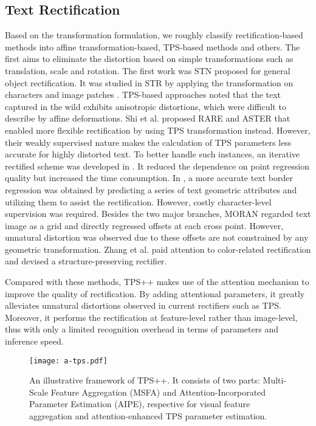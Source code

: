 \documentclass{article}
\begin{document}
\subsection{Text Rectification}
Based on the transformation formulation, we roughly classify rectification-based methods into affine transformation-based, TPS-based methods and others.
The first aims to eliminate the distortion based on simple transformations such as translation, scale and rotation. The first work was STN \cite{jaderberg2015stn} proposed for general object rectification. It was studied in STR by applying the transformation on characters \cite{liu2016starnet} and image patches \cite{lin2021stan}.
TPS-based approaches noted that the text captured in the wild exhibits anisotropic distortions, which were difficult to describe by affine deformations. Shi et al. proposed RARE \cite{shi2016robust_auto_rect} and ASTER \cite{shi2018aster} that enabled more flexible rectification by using TPS \cite{bookstein1989tps} transformation instead. However, their weakly supervised nature makes the calculation of TPS parameters less accurate for highly distorted text.
To better handle such instances, an iterative rectified scheme was developed in \cite{zhan2019esir}. It reduced the dependence on point regression quality but increased the time consumption. In \cite{yang2019symmetry}, a more accurate text border regression was obtained by predicting a series of text geometric attributes and utilizing them to assist the rectification. However, costly character-level supervision was required. Besides the two major branches, MORAN \cite{cluo2019moran} regarded text image as a grid and directly regressed offsets at each cross point. However, unnatural distortion was observed due to these offsets are not constrained by any geometric transformation. Zhang et al. \cite{zhang2021spin} paid attention to color-related rectification and devised a structure-preserving rectifier.

Compared with these methods, TPS++ makes use of the attention mechanism to improve the quality of rectification. By adding attentional parameters, it greatly alleviates unnatural distortions observed in current rectifiers such as TPS. Moreover, it performs the rectification at feature-level rather than image-level, thus with only a limited recognition overhead in terms of parameters and inference speed.


\begin{figure*}[t]
\centering
\texttt{[image:  a-tps.pdf]} \caption{An illustrative framework of TPS++. It consists of two parts: Multi-Scale Feature Aggregation (MSFA) and Attention-Incorporated Parameter Estimation (AIPE), respective for visual feature aggregation and attention-enhanced TPS parameter estimation.}
\label{fig1:TPS++}
\end{figure*}
\end{document}
